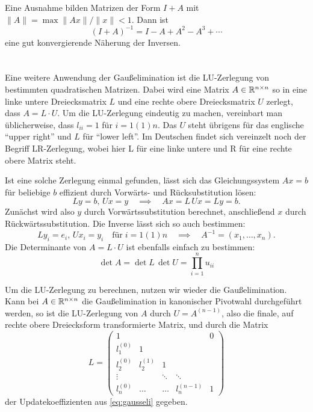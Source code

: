 Eine Ausnahme bilden Matrizen der Form $I + A$ mit $\lVert A \rVert =
\max \lVert Ax\rVert / \lVert x \rVert < 1$. Dann ist
\begin{equation}
  (I+A)^{-1} = I - A + A^2 - A^3 + \cdots
\end{equation}
eine gut konvergierende Näherung der Inversen.

\section{}

Eine weitere Anwendung der Gaußelimination ist die LU-Zerlegung von
bestimmten quadratischen Matrizen. Dabei wird eine Matrix
$A\in\mathbb{R}^{n\times n}$ so in eine linke untere Dreiecksmatrix $L$
und eine rechte obere Dreiecksmatrix $U$ zerlegt, dass $A=L\cdot U$.
Um die LU-Zerlegung eindeutig zu machen, vereinbart man üblicherweise,
dass $l_{ii}=1$ für $i=1(1)n$. Das $U$ steht übrigens für das
englische "`upper right"' und $L$ für "`lower left"'. Im Deutschen
findet sich vereinzelt noch der Begriff LR-Zerlegung, wobei hier L für
eine linke untere und R für eine rechte obere Matrix steht.

Ist eine solche Zerlegung einmal gefunden, lässt sich das
Gleichungssystem $Ax=b$ für beliebige $b$ effizient durch Vorwärts-
und Rücksubstitution lösen:
\begin{equation}
  L y = b,\, U x = y \quad\implies\quad Ax = L\,U x = L y = b.
\end{equation}
Zunächst wird also $y$ durch Vorwärtssubstitution berechnet,
anschließend $x$ durch Rückwärtssubstitution. Die Inverse lässt
sich so auch bestimmen:
\begin{equation}
  L y_i = e_i,\, U x_i = y_i\quad\text{für}\; i=1(1)n
  \quad\implies\quad  A^{-1} = \left(x_1,
    \ldots, x_n\right).
\end{equation}
Die Determinante von $A=L\cdot U$ ist ebenfalls einfach zu bestimmen:
\begin{equation}
  \det A = \det L\,\det U = \prod_{i=1}^n u_{ii}
\end{equation}

Um die LU-Zerlegung zu berechnen, nutzen wir wieder die
Gaußelimination.  Kann bei $A\in\mathbb{R}^{n\times n}$ die Gaußelimination
in kanonischer Pivotwahl durchgeführt werden, so ist die LU-Zerlegung
von $A$ durch $U=A^{(n-1)}$, also die finale, auf rechte obere
Dreiecksform transformierte Matrix, und durch die Matrix
\begin{equation}
  L =
  \begin{pmatrix}
    1       &          &         &          & 0 \\
    l_1^{(0)} & 1       &         &           &  \\
    l_2^{(0)} & l_2^{(1)} & 1       &          &  \\
    \vdots  &          & \ddots & \ddots    & \\
    l_n^{(0)} & \ldots  & \ldots  & l_n^{(n-1)} & 1
  \end{pmatrix}
\end{equation}
der Updatekoeffizienten aus \eqref{eq:gausseli} gegeben.

